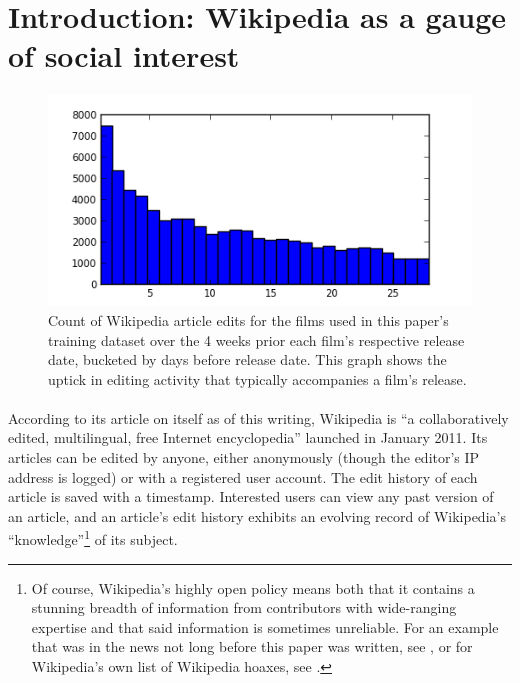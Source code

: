 \documentclass[10pt]{article}
\begin{document}
    \maketitle
    
    \section{Introduction: Wikipedia as a gauge of social interest}
    
    \begin{figure}[h]
        \centering
        \includegraphics{wikipedia28.png}
        \caption{Count of Wikipedia article edits for the films used in this paper's training dataset over the 4 weeks prior each film's respective release date, bucketed by days before release date. This graph shows the uptick in editing activity that typically accompanies a film's release.}
    \end{figure}
    
    \paragraph{}
    According to its article on itself as of this writing, Wikipedia is ``a collaboratively edited, multilingual, free Internet encyclopedia'' launched in January 2011. Its articles can be edited by anyone, either anonymously (though the editor's IP address is logged) or with a registered user account. The edit history of each article is saved with a timestamp. Interested users can view any past version of an article, and an article's edit history exhibits an evolving record of Wikipedia's ``knowledge''\footnote{Of course, Wikipedia's highly open policy means both that it contains a stunning breadth of information from contributors with wide-ranging expertise and that said information is sometimes unreliable. For an example that was in the news not long before this paper was written, see \cite{bicholm}, or for Wikipedia's own list of Wikipedia hoaxes, see \cite{wikipedia-hoaxes}.} of its subject. 
    
\end{document}
